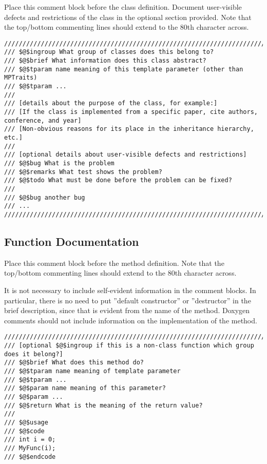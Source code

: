 \documentclass[12pt]{article}
\begin{document}
Place this comment block before the class definition. Document user-visible
defects and restrictions of the class in the optional section provided. Note
that the top/bottom commenting lines should extend to the 80th character across.

\begin{lstlisting}[mathescape]
///////////////////////////////////////////////////////////////////////////////
/// $@$ingroup What group of classes does this belong to?
/// $@$brief What information does this class abstract?
/// $@$tparam name meaning of this template parameter (other than MPTraits)
/// $@$tparam ...
///
/// [details about the purpose of the class, for example:]
/// [If the class is implemented from a specific paper, cite authors, conference, and year]
/// [Non-obvious reasons for its place in the inheritance hierarchy, etc.]
///
/// [optional details about user-visible defects and restrictions]
/// $@$bug What is the problem
/// $@$remarks What test shows the problem?
/// $@$todo What must be done before the problem can be fixed?
///
/// $@$bug another bug
/// ...
///////////////////////////////////////////////////////////////////////////////
\end{lstlisting}

\subsection{Function Documentation}

Place this comment block before the method definition. Note that the top/bottom
commenting lines should extend to the 80th character across.

It is not necessary to include self-evident information in the comment blocks.
In particular, there is no need to put ”default constructor” or ”destructor” in
the brief description, since that is evident from the name of the method.
Doxygen comments should not include information on the implementation of the
method.

\begin{lstlisting}[mathescape]
///////////////////////////////////////////////////////////////////////////////
/// [optional $@$ingroup if this is a non-class function which group does it belong?]
/// $@$brief What does this method do?
/// $@$tparam name meaning of template parameter
/// $@$tparam ...
/// $@$param name meaning of this parameter?
/// $@$param ...
/// $@$return What is the meaning of the return value?
///
/// $@$usage
/// $@$code
/// int i = 0;
/// MyFunc(i);
/// $@$endcode
\end{lstlisting}
\end{document}
